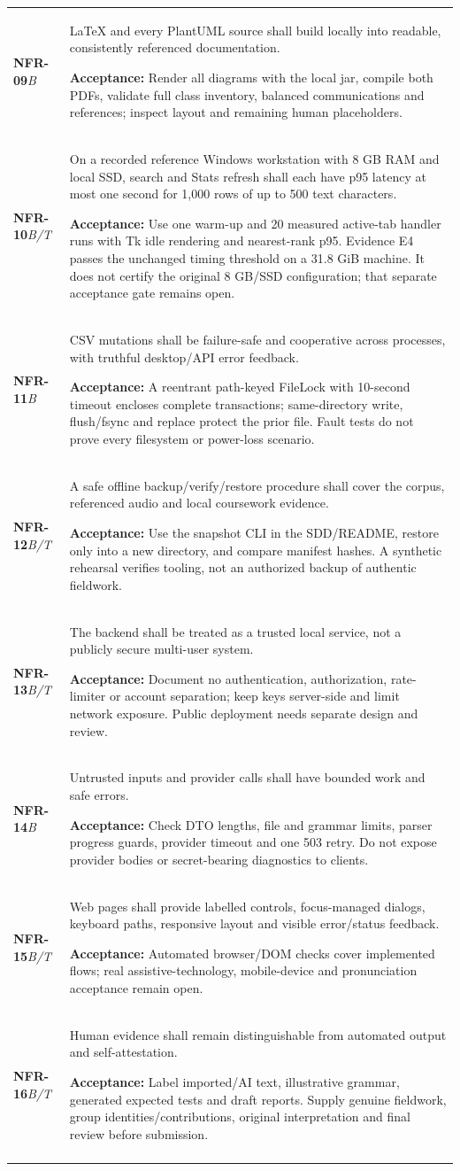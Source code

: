 \documentclass[11pt,a4paper]{article}
\newcommand{\requirement}[4]{\textbf{#1}\newline\textit{#2} & #3\par\smallskip\textbf{Acceptance:} #4\\\addlinespace}
\begin{document}
\begin{longtable}{L{1.8cm}L{12.5cm}}
\requirement{NFR-09}{B}
{LaTeX and every PlantUML source shall build locally into readable, consistently referenced documentation.}
{Render all diagrams with the local jar, compile both PDFs, validate full class inventory, balanced communications and references; inspect layout and remaining human placeholders.}
\requirement{NFR-10}{B/T}
{On a recorded reference Windows workstation with 8 GB RAM and local SSD, search and Stats refresh shall each have p95 latency at most one second for 1,000 rows of up to 500 text characters.}
{Use one warm-up and 20 measured active-tab handler runs with Tk idle rendering and nearest-rank p95. Evidence E4 passes the unchanged timing threshold on a 31.8 GiB machine. It does not certify the original 8 GB/SSD configuration; that separate acceptance gate remains open.}
\requirement{NFR-11}{B}
{CSV mutations shall be failure-safe and cooperative across processes, with truthful desktop/API error feedback.}
{A reentrant path-keyed FileLock with 10-second timeout encloses complete transactions; same-directory write, flush/fsync and replace protect the prior file. Fault tests do not prove every filesystem or power-loss scenario.}
\requirement{NFR-12}{B/T}
{A safe offline backup/verify/restore procedure shall cover the corpus, referenced audio and local coursework evidence.}
{Use the snapshot CLI in the SDD/README, restore only into a new directory, and compare manifest hashes. A synthetic rehearsal verifies tooling, not an authorized backup of authentic fieldwork.}
\requirement{NFR-13}{B/T}
{The backend shall be treated as a trusted local service, not a publicly secure multi-user system.}
{Document no authentication, authorization, rate-limiter or account separation; keep keys server-side and limit network exposure. Public deployment needs separate design and review.}
\requirement{NFR-14}{B}
{Untrusted inputs and provider calls shall have bounded work and safe errors.}
{Check DTO lengths, file and grammar limits, parser progress guards, provider timeout and one 503 retry. Do not expose provider bodies or secret-bearing diagnostics to clients.}
\requirement{NFR-15}{B/T}
{Web pages shall provide labelled controls, focus-managed dialogs, keyboard paths, responsive layout and visible error/status feedback.}
{Automated browser/DOM checks cover implemented flows; real assistive-technology, mobile-device and pronunciation acceptance remain open.}
\requirement{NFR-16}{B/T}
{Human evidence shall remain distinguishable from automated output and self-attestation.}
{Label imported/AI text, illustrative grammar, generated expected tests and draft reports. Supply genuine fieldwork, group identities/contributions, original interpretation and final review before submission.}
\bottomrule\end{longtable}
\end{document}

